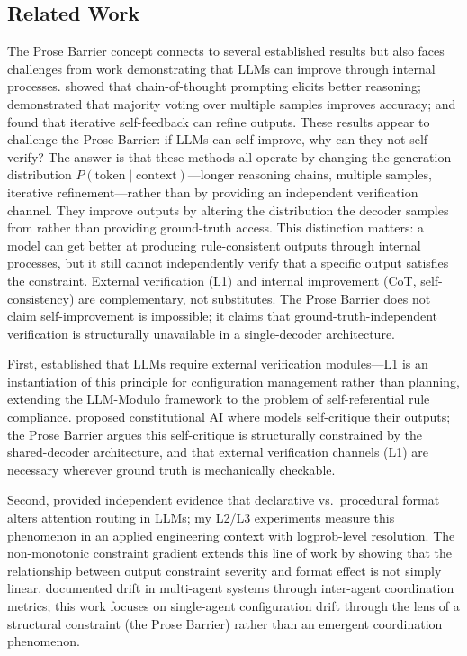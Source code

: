 \documentclass[11pt]{article}
\begin{document}
\subsection{Related Work}

The Prose Barrier concept connects to several established results but also
faces challenges from work demonstrating that LLMs can improve through internal
processes. \citet{wei2022cot} showed that chain-of-thought prompting elicits
better reasoning; \citet{wang2022selfconsistency} demonstrated that majority
voting over multiple samples improves accuracy; and \citet{madaan2023selfrefine}
found that iterative self-feedback can refine outputs. These results appear to
challenge the Prose Barrier: if LLMs can self-improve, why can they not
self-verify? The answer is that these methods all operate by changing the
generation distribution $P(\text{token} \mid \text{context})$---longer reasoning
chains, multiple samples, iterative refinement---rather than by providing an
independent verification channel. They improve outputs by altering the
distribution the decoder samples from rather than providing ground-truth
access. This distinction matters: a model can get better at producing
rule-consistent outputs through internal processes, but it still cannot
independently verify that a specific output satisfies the constraint. External
verification (L1) and internal improvement (CoT, self-consistency) are
complementary, not substitutes. The Prose Barrier does not claim self-improvement
is impossible; it claims that ground-truth-independent verification is
structurally unavailable in a single-decoder architecture.

First, \citet{kambhampati2024} established that LLMs require external
verification modules---L1 is an instantiation of this principle for configuration
management rather than planning, extending the LLM-Modulo framework to the
problem of self-referential rule compliance. \citet{bai2022constitutional}
proposed constitutional AI where models self-critique their outputs; the Prose
Barrier argues this self-critique is structurally constrained by the
shared-decoder architecture, and that external verification channels (L1) are
necessary wherever ground truth is mechanically checkable.

Second, \citet{pendereffect2026} provided independent evidence that declarative
vs.\ procedural format alters attention routing in LLMs; my L2/L3 experiments
measure this phenomenon in an applied engineering context with logprob-level
resolution. The non-monotonic constraint gradient extends this line of work by
showing that the relationship between output constraint severity and format
effect is not simply linear. \citet{rath2026agent} documented drift in
multi-agent systems through inter-agent coordination metrics; this work focuses
on single-agent configuration drift through the lens of a structural constraint
(the Prose Barrier) rather than an emergent coordination phenomenon.
\end{document}

